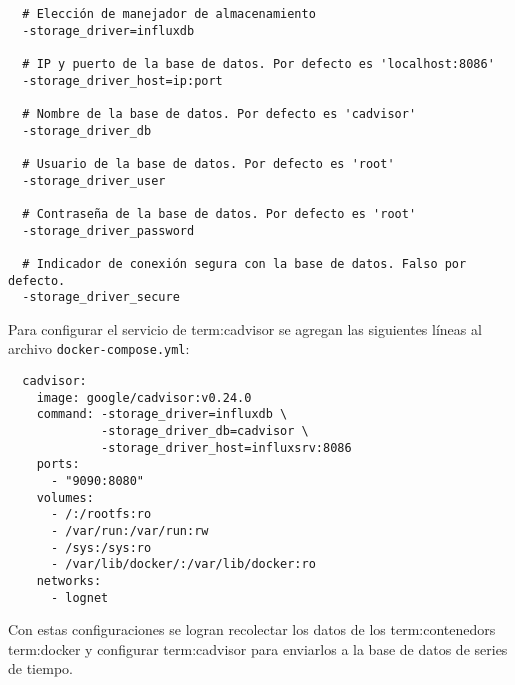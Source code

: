 \begin{lstlisting}
  # Elección de manejador de almacenamiento
  -storage_driver=influxdb

  # IP y puerto de la base de datos. Por defecto es 'localhost:8086'
  -storage_driver_host=ip:port

  # Nombre de la base de datos. Por defecto es 'cadvisor'
  -storage_driver_db

  # Usuario de la base de datos. Por defecto es 'root'
  -storage_driver_user

  # Contraseña de la base de datos. Por defecto es 'root'
  -storage_driver_password

  # Indicador de conexión segura con la base de datos. Falso por defecto.
  -storage_driver_secure
\end{lstlisting}

Para configurar el servicio de \gls{term:cadvisor} se agregan las siguientes
líneas al archivo \lstinline{docker-compose.yml}:

\begin{lstlisting}
  cadvisor:
    image: google/cadvisor:v0.24.0
    command: -storage_driver=influxdb \
             -storage_driver_db=cadvisor \
             -storage_driver_host=influxsrv:8086
    ports:
      - "9090:8080"
    volumes:
      - /:/rootfs:ro
      - /var/run:/var/run:rw
      - /sys:/sys:ro
      - /var/lib/docker/:/var/lib/docker:ro
    networks:
      - lognet
\end{lstlisting}

Con estas configuraciones se logran recolectar los datos de los
\glspl{term:contenedor} \gls{term:docker} y configurar \gls{term:cadvisor} para
enviarlos a la base de datos de series de tiempo.
